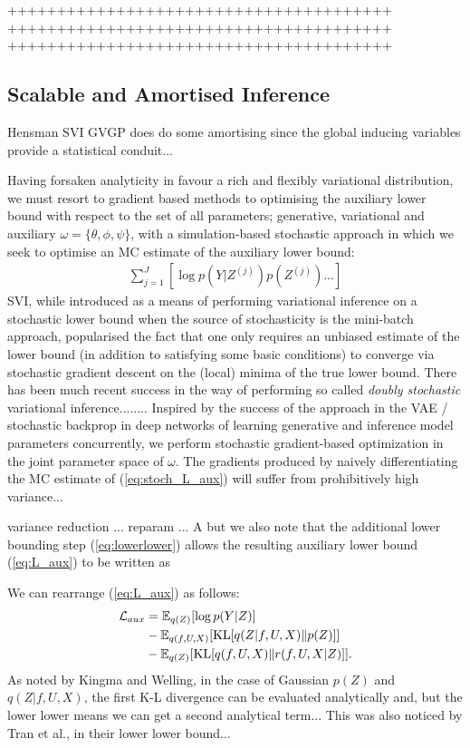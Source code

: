 \documentclass[]{article}
\newcommand{\Ex}{\mathbb{E}}
\newcommand{\KL}{\textrm{KL}}
\newcommand{\f}{f}
\begin{document}
+++++++++++++++++++++++++++++++++++++++
+++++++++++++++++++++++++++++++++++++++
+++++++++++++++++++++++++++++++++++++++

\subsection{Scalable and Amortised Inference}\label{subsec:scale}

Hensman SVI GVGP does do some amortising since the global inducing variables provide a statistical conduit...

Having forsaken analyticity in favour a rich and flexibly variational distribution, we must resort to gradient based methods to optimising the auxiliary lower bound with respect to the set of all parameters; generative, variational and auxiliary $\omega=\{\theta,\phi,\psi\}$, with a simulation-based stochastic approach in which we seek to optimise an MC estimate of the auxiliary lower bound:
%
\begin{align}
  \sum_{j=1}^J [\log p(Y|Z^{(j)})p(Z^{(j)})...]\label{eq:stoch_L_aux}
\end{align}
%
SVI, while introduced as a means of performing variational inference on a stochastic lower bound when the source of stochasticity is the mini-batch approach, popularised the fact that one only requires an unbiased estimate of the lower bound (in addition to satisfying some basic conditions) to converge via stochastic gradient descent on the (local) minima of the true lower bound.
There has been much recent success in the way of performing so called \emph{doubly stochastic} variational inference........
Inspired by the success of the approach in the VAE / stochastic backprop in deep networks of learning generative and inference model parameters concurrently, we perform stochastic gradient-based optimization in the joint parameter space of $\omega$.
The gradients produced by naively differentiating the MC estimate of (\ref{eq:stoch_L_aux}) will suffer from prohibitively high variance...

variance reduction ... reparam ... A but we also note that the additional lower bounding step (\ref{eq:lowerlower}) allows the resulting auxiliary lower bound (\ref{eq:L_aux}) to be written as

We can rearrange (\ref{eq:L_aux}) as follows:
%
\begin{align}
\mathcal{L}_{aux} &= \Ex_{q(Z)}[ \log p(Y|Z) ] \notag \\
&- \Ex_{q(\f,U,X)}[ \KL[q(Z|\f,U,X)\Vert p(Z)] ]\notag\\
&- \Ex_{q(Z)}[ \KL[q(\f,U,X)\Vert r(\f,U,X|Z)] ].\label{eq:L_aux_ABC}
\end{align}
%
As noted by Kingma and Welling, in the case of Gaussian $p(Z)$ and $q(Z|\f,U,X)$, the first K-L divergence can be evaluated analytically and, but the lower lower means we can get a second analytical term...
This was also noticed by Tran et al., in their lower lower bound...
\end{document}
